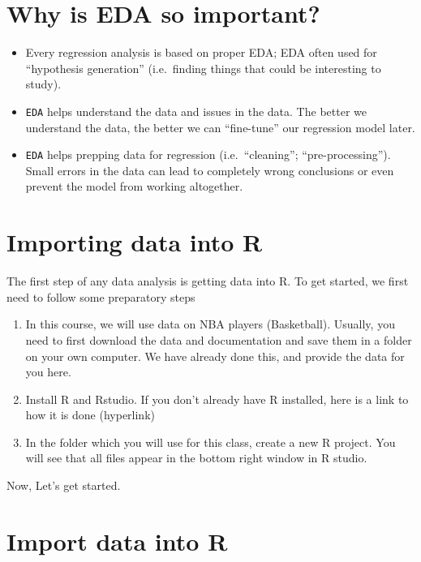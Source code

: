 \documentclass[
]{book}
\providecommand{\tightlist}{%
  \setlength{\itemsep}{0pt}\setlength{\parskip}{0pt}}
\begin{document}
\hypertarget{why-is-eda-so-important}{%
\section{Why is EDA so important?}\label{why-is-eda-so-important}}

\begin{itemize}
\tightlist
\item
  Every regression analysis is based on proper EDA; EDA often used for ``hypothesis generation'' (i.e.~finding things that could be interesting to study).
\item
  \texttt{EDA} helps understand the data and issues in the data. The better we understand the data, the better we can ``fine-tune'' our regression model later.
\item
  \texttt{EDA} helps prepping data for regression (i.e.~``cleaning''; ``pre-processing''). Small errors in the data can lead to completely wrong conclusions or even prevent
  the model from working altogether.
\end{itemize}

\hypertarget{importing-data-into-r}{%
\section{Importing data into R}\label{importing-data-into-r}}

The first step of any data analysis is getting data into R. To get started, we first need to follow some preparatory steps

\begin{enumerate}
\def\labelenumi{\arabic{enumi}.}
\item
  In this course, we will use data on NBA players (Basketball). Usually, you need to first download the data and documentation and save them in a folder on your own computer. We have already done this, and provide the data for you here.
\item
  Install R and Rstudio. If you don't already have R installed, here is a link to how it is done (hyperlink)
\item
  In the folder which you will use for this class, create a new R project. You will see that all files appear in the bottom right window in R studio.
\end{enumerate}

Now, Let's get started.

\hypertarget{import-data-into-r}{%
\section{Import data into R}\label{import-data-into-r}}
\end{document}
